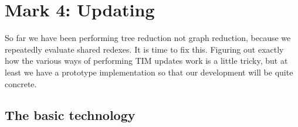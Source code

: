 \section{Mark 4: Updating}
\label{sect:tim-updates}

So far we have been performing tree reduction not graph reduction,
because we repeatedly evaluate shared redexes.
It is time to fix this.
Figuring out exactly how the various ways of performing TIM updates
work is a little tricky, but at least we have a prototype implementation
so that our development will be quite concrete.

\subsection{The basic technology}

